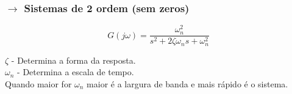 \renewcommand*{\thefootnote}{\fnsymbol{footnote}}
\renewcommand*{\thefootnote}{\arabic{footnote}}

\subsubsection[1.2.3 Sistemas de 2\textordfeminine{} ordem (sem zeros)]{$\pmb{\rightarrow}$ Sistemas de 2\textordfeminine{} ordem (sem zeros)}

$$
    G(j\omega) = \frac{\omega_n^2}{s^2 + 2\zeta\omega_ns + \omega_n^2}
$$

\begin{mdframed}
    \noindent $\zeta$ - Determina a forma da resposta.\\
    \noindent $\omega_n$ - Determina a escala de tempo.\\ 
    \noindent Quando maior for $\omega_n$ maior é a largura de banda e mais rápido é o sistema.
\end{mdframed}

